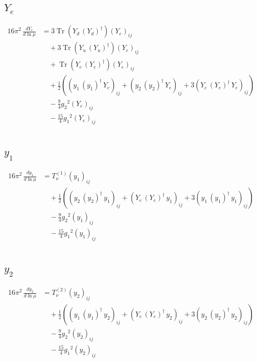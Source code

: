 \documentclass[10pt,a4paper]{article}
\begin{document}
\subsection*{$Y_e$}
\begin{align*}
16\pi^2\,\frac{d Y_e}{d\ln\mu} &=3 \operatorname{Tr}\!\left({Y_d}\,\left({Y_d}\right)^{\dagger}\right) \left({Y_e}\right)_{ij} \\
&\quad +3 \operatorname{Tr}\!\left({Y_u}\,\left({Y_u}\right)^{\dagger}\right) \left({Y_e}\right)_{ij} \\
&\quad +\operatorname{Tr}\!\left({Y_e}\,\left({Y_e}\right)^{\dagger}\right) \left({Y_e}\right)_{ij} \\
&\quad +\frac{1}{2} (\left({y_1}\,\left({y_1}\right)^{\dagger}\,{Y_e}\right)_{ij}+\left({y_2}\,\left({y_2}\right)^{\dagger}\,{Y_e}\right)_{ij}+3 \left({Y_e}\,\left({Y_e}\right)^{\dagger}\,{Y_e}\right)_{ij}) \\
&\quad -\frac{9}{4} {g_2}^2 \left({Y_e}\right)_{ij} \\
&\quad -\frac{15}{4} {g_1}^2 \left({Y_e}\right)_{ij} \\
\end{align*}
\subsection*{$y_1$}
\begin{align*}
16\pi^2\,\frac{d y_1}{d\ln\mu} &=T_{\nu}^{(1)} \left({y_1}\right)_{ij} \\
&\quad +\frac{1}{2} (\left({y_2}\,\left({y_2}\right)^{\dagger}\,{y_1}\right)_{ij}+\left({Y_e}\,\left({Y_e}\right)^{\dagger}\,{y_1}\right)_{ij}+3 \left({y_1}\,\left({y_1}\right)^{\dagger}\,{y_1}\right)_{ij}) \\
&\quad -\frac{9}{4} {g_2}^2 \left({y_1}\right)_{ij} \\
&\quad -\frac{15}{4} {g_1}^2 \left({y_1}\right)_{ij} \\
\end{align*}
\subsection*{$y_2$}
\begin{align*}
16\pi^2\,\frac{d y_2}{d\ln\mu} &=T_{\nu}^{(2)} \left({y_2}\right)_{ij} \\
&\quad +\frac{1}{2} (\left({y_1}\,\left({y_1}\right)^{\dagger}\,{y_2}\right)_{ij}+\left({Y_e}\,\left({Y_e}\right)^{\dagger}\,{y_2}\right)_{ij}+3 \left({y_2}\,\left({y_2}\right)^{\dagger}\,{y_2}\right)_{ij}) \\
&\quad -\frac{9}{4} {g_2}^2 \left({y_2}\right)_{ij} \\
&\quad -\frac{15}{4} {g_1}^2 \left({y_2}\right)_{ij} \\
\end{align*}
\end{document}
